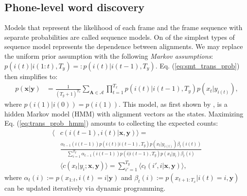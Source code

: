 \documentclass[journal]{IEEEtran}
\begin{document}

\subsection{Phone-level word discovery}
Models that represent the likelihood of each frame and the frame sequence with separate probabilities are called sequence models. On of the simplest types of sequence model represents the dependence between alignments. We may replace the uniform prior assumption with the following \textit{Markov assumptions}: $p(i(t)|i(1:t), T_y) =: p(i(t)|i(t-1), T_y)$. Eq. (\ref{eq:smt_trans_prob}) then simplifies to:
\begin{align}\label{eq:trans_prob_hmm}
    p(\mathbf x|\mathbf y) &= \frac{1}{(T_y+1)^{T_x}}\sum_{\mathbf A \in \mathcal A}\prod_{t=1}^{T_x} p(i(t)|i(t-1), T_y) p(x_{t}|y_{i(t)}),
\end{align}
where $p(i(1)|i(0)) = p(i(1))$. This model, as first shown by \cite{Vogel1996, Och2003}, is a hidden Markov model (HMM) with alignment vectors as the states. Maximizing Eq. (\ref{eq:trans_prob_hmm}) amounts to collecting the expected counts:
\begin{align}\label{eq:expected_counts_dhmm}
\langle &c(i(t-1), i(t)|\mathbf x, \mathbf y)\rangle
= \nonumber\\
&\frac{\alpha_{t-1}(i(t-1))p(i(t)|i(t-1), T_y)p(x_t|y_{i(t)})\beta_{t}(i(t))}{\sum_{i=1}^{T_y}\alpha_{t-1}(i(t-1))p(i|i(t-1), T_y)p(x_t|y_{i})\beta_t(i)}\\
&\langle c(x_t|y_i; \mathbf x, \mathbf y)\rangle
= \sum_{i'=1}^{T_y}\langle c_t(i', i| \mathbf x, \mathbf y)\rangle,
\end{align}
where $\alpha_t(i) := p(x_{1:t}, i(t)=i|\mathbf y)$ and $\beta_t(i) := p(x_{t+1:T_x}|i(t)=i, \mathbf y)$ can be updated iteratively via dynamic programming.
\end{document}
